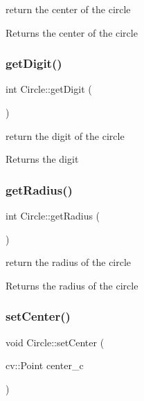 return the center of the circle \begin{DoxyReturn}{Returns}
the center of the circle 
\end{DoxyReturn}
\mbox{\label{class_circle_a50656c826a70e13fa75eb696a0dd3123}} 
\subsubsection{\texorpdfstring{get\+Digit()}{getDigit()}}
{\footnotesize\ttfamily int Circle\+::get\+Digit (\begin{DoxyParamCaption}{ }\end{DoxyParamCaption})}

return the digit of the circle \begin{DoxyReturn}{Returns}
the digit 
\end{DoxyReturn}
\mbox{\label{class_circle_adfc2e5e026f5d80215563cc42260a237}} 
\subsubsection{\texorpdfstring{get\+Radius()}{getRadius()}}
{\footnotesize\ttfamily int Circle\+::get\+Radius (\begin{DoxyParamCaption}{ }\end{DoxyParamCaption})}

return the radius of the circle \begin{DoxyReturn}{Returns}
the radius of the circle 
\end{DoxyReturn}
\mbox{\label{class_circle_a242599150a3623ea837fcb599214e33b}} 
\subsubsection{\texorpdfstring{set\+Center()}{setCenter()}}
{\footnotesize\ttfamily void Circle\+::set\+Center (\begin{DoxyParamCaption}\item[{cv\+::\+Point}]{center\+\_\+c }\end{DoxyParamCaption})}

